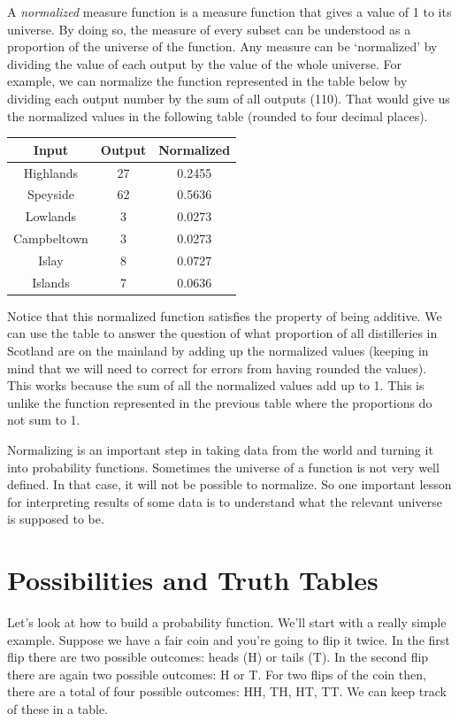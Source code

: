 \documentclass[]{tufte-book}
\begin{document}
A \emph{normalized} measure function is a measure function that gives a value of 1 to its universe. By doing so, the measure of every subset can be understood as a proportion of the universe of the function. Any measure can be `normalized' by dividing the value of each output by the value of the whole universe. For example, we can normalize the function represented in the table below by dividing each output number by the sum of all outputs (110). That would give us the normalized values in the following table (rounded to four decimal places).

\begin{longtable}[]{@{}ccc@{}}
\toprule
Input & Output & Normalized\tabularnewline
\midrule
\endhead
Highlands & 27 & 0.2455\tabularnewline
Speyside & 62 & 0.5636\tabularnewline
Lowlands & 3 & 0.0273\tabularnewline
Campbeltown & 3 & 0.0273\tabularnewline
Islay & 8 & 0.0727\tabularnewline
Islands & 7 & 0.0636\tabularnewline
\bottomrule
\end{longtable}

Notice that this normalized function satisfies the property of being additive. We can use the table to answer the question of what proportion of all distilleries in Scotland are on the mainland by adding up the normalized values (keeping in mind that we will need to correct for errors from having rounded the values). This works because the sum of all the normalized values add up to 1. This is unlike the function represented in the previous table where the proportions do not sum to 1.

Normalizing is an important step in taking data from the world and turning it into probability functions. Sometimes the universe of a function is not very well defined. In that case, it will not be possible to normalize. So one important lesson for interpreting results of some data is to understand what the relevant universe is supposed to be.

\hypertarget{possibilities-and-truth-tables}{%
\section{Possibilities and Truth Tables}\label{possibilities-and-truth-tables}}

Let's look at how to build a probability function. We'll start with a really simple example. Suppose we have a fair coin and you're going to flip it twice. In the first flip there are two possible outcomes: heads (H) or tails (T). In the second flip there are again two possible outcomes: H or T. For two flips of the coin then, there are a total of four possible outcomes: HH, TH, HT, TT. We can keep track of these in a table.
\end{document}
